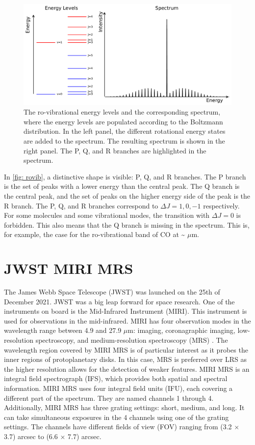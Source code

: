 \documentclass[oneside, single, authoryear, semicolon, 12pt]{lion-msc}
\newcommand{\4}{$_4$}
\newcommand{\3}{$_3$}
\newcommand{\2}{$_2$}
\begin{document}
\begin{figure}[H]
    \centering
    \includegraphics[width=\linewidth]{Figures/RoVibSpectrum.pdf}
    \caption{The ro-vibrational energy levels and the corresponding spectrum, where the energy levels are populated according to the Boltzmann distribution. In the left panel, the different rotational energy states are added to the spectrum. The resulting spectrum is shown in the right panel. The P, Q, and R branches are highlighted in the spectrum. }
    \label{fig: rovib}
\end{figure}

In \autoref{fig: rovib}, a distinctive shape is visible: P, Q, and R branches. The P branch is the set of peaks with a lower energy than the central peak. The Q branch is the central peak, and the set of peaks on the higher energy side of the peak is the R branch. The P, Q, and R branches correspond to $\Delta J=1, 0, -1$ respectively. For some molecules and some vibrational modes, the transition with $\Delta J=0$ is forbidden. This also means that the Q branch is missing in the spectrum. This is, for example, the case for the ro-vibrational band of CO at \~ $\mu$m.

\section{JWST MIRI MRS}
The James Webb Space Telescope (JWST) was launched on the 25th of December 2021. JWST was a big leap forward for space research. One of the instruments on board is the Mid-Infrared Instrument (MIRI). This instrument is used for observations in the mid-infrared. MIRI has four observation modes in the wavelength range between 4.9 and 27.9 $\mu$m:  imaging, coronagraphic imaging, low-resolution spectroscopy, and medium-resolution spectroscopy (MRS) \citep{}. 
The wavelength region covered by MIRI MRS is of particular interest as it probes the inner regions of protoplanetary disks. In this case, MRS is preferred over LRS as the higher resolution allows for the detection of weaker features. MIRI MRS is an integral field spectrograph (IFS), which provides both spatial and spectral information. MIRI MRS uses four integral field units (IFU), each covering a different part of the spectrum. They are named channels 1 through 4. Additionally, MIRI MRS has three grating settings: short, medium, and long. It can take simultaneous exposures in the 4 channels using one of the grating settings. The channels have different fields of view (FOV) ranging from (3.2 $\times$ 3.7) arcsec to (6.6 $\times$ 7.7) arcsec. 
\end{document}

